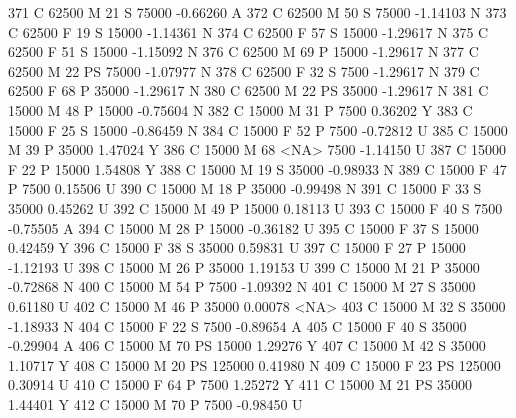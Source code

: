 \documentclass{article}
\begin{document}
\begin{Schunk}
\begin{Soutput}
371       C      62500   M  21         S  75000  -0.66260    A
372       C      62500   M  50         S  75000  -1.14103    N
373       C      62500   F  19         S  15000  -1.14361    N
374       C      62500   F  57         S  15000  -1.29617    N
375       C      62500   F  51         S  15000  -1.15092    N
376       C      62500   M  69         P  15000  -1.29617    N
377       C      62500   M  22        PS  75000  -1.07977    N
378       C      62500   F  32         S   7500  -1.29617    N
379       C      62500   F  68         P  35000  -1.29617    N
380       C      62500   M  22        PS  35000  -1.29617    N
381       C      15000   M  48         P  15000  -0.75604    N
382       C      15000   M  31         P   7500   0.36202    Y
383       C      15000   F  25         S  15000  -0.86459    N
384       C      15000   F  52         P   7500  -0.72812    U
385       C      15000   M  39         P  35000   1.47024    Y
386       C      15000   M  68      <NA>   7500  -1.14150    U
387       C      15000   F  22         P  15000   1.54808    Y
388       C      15000   M  19         S  35000  -0.98933    N
389       C      15000   F  47         P   7500   0.15506    U
390       C      15000   M  18         P  35000  -0.99498    N
391       C      15000   F  33         S  35000   0.45262    U
392       C      15000   M  49         P  15000   0.18113    U
393       C      15000   F  40         S   7500  -0.75505    A
394       C      15000   M  28         P  15000  -0.36182    U
395       C      15000   F  37         S  15000   0.42459    Y
396       C      15000   F  38         S  35000   0.59831    U
397       C      15000   F  27         P  15000  -1.12193    U
398       C      15000   M  26         P  35000   1.19153    U
399       C      15000   M  21         P  35000  -0.72868    N
400       C      15000   M  54         P   7500  -1.09392    N
401       C      15000   M  27         S  35000   0.61180    U
402       C      15000   M  46         P  35000   0.00078 <NA>
403       C      15000   M  32         S  35000  -1.18933    N
404       C      15000   F  22         S   7500  -0.89654    A
405       C      15000   F  40         S  35000  -0.29904    A
406       C      15000   M  70        PS  15000   1.29276    Y
407       C      15000   M  42         S  35000   1.10717    Y
408       C      15000   M  20        PS 125000   0.41980    N
409       C      15000   F  23        PS 125000   0.30914    U
410       C      15000   F  64         P   7500   1.25272    Y
411       C      15000   M  21        PS  35000   1.44401    Y
412       C      15000   M  70         P   7500  -0.98450    U

\end{Soutput}
\end{Schunk}
\end{document}
